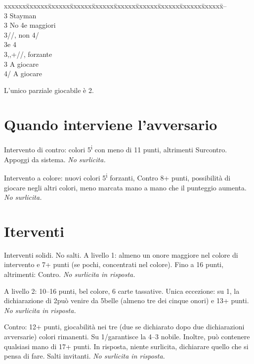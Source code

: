 \documentclass[a4paper,italian,12pt]{article}
\newcommand\SA{{\smaller{SA}}\xspace}
\newenvironment{bidtable}
{\begin{tabbing}

    xxxxxx\=xxxxxx\=xxxxxx\=xxxxxx\=xxxxxx\=xxxxxx\=xxxxxx\=xxxxxx\=xxxxxx\=xxxxxx\=\kill}
{\end{tabbing} }%
\begin{document}
\begin{bidtable}
    2\SA--\+\\
    3\Cl\>\> Stayman\+\+\\
    3\Di\> No 4e maggiori\\
    3\He/\Sp {}\He/\Sp, non 4\Sp/\He\\
    3\SA {}\He e 4\Sp\-\-\\
    3\Di,\He,\Sp \>+\Di/\He/\Sp, forzante\\
    3\SA \>\> A giocare\\
    4\He/\Sp \>\> A giocare
\end{bidtable}
L'unico parziale giocabile è 2\SA.

\section*{Quando interviene l'avversario}
Intervento di contro: colori 5\textsuperscript{i} con meno di 11 punti, altrimenti Surcontro. Appoggi da sistema. \emph{No surlicita.}

Intervento a colore: nuovi colori 5\textsuperscript{i} forzanti, Contro 8+ punti, possibilità di giocare negli altri
colori, meno marcata mano a mano che il punteggio aumenta. \emph{No surlicita.}

\section*{Iterventi}
Interventi solidi. No salti. A livello 1: almeno un onore maggiore nel colore di intervento e 7+ punti (se pochi, concentrati nel
colore). Fino a 16 punti, altrimenti: Contro. \emph{No surlicita in risposta.}

A livello 2: 10--16 punti, bel colore, 6 carte tassative. Unica eccezione: su 1\Sp, la dichiarazione di 2\He può venire
da 5\He belle (almeno tre dei cinque onori) e 13+ punti. \emph{No surlicita in risposta.}

Contro: 12+ punti, giocabilità nei tre (due se dichiarato dopo due dichiarazioni avversarie) colori rimanenti. Su
1\Cl/\Di garantisce la 4--3 nobile. Inoltre, può contenere qualsiasi mano
di 17+ punti. In risposta, niente surlicita, dichiarare quello che si pensa di fare. Salti invitanti. \emph{No surlicita in risposta.}
\end{document}
